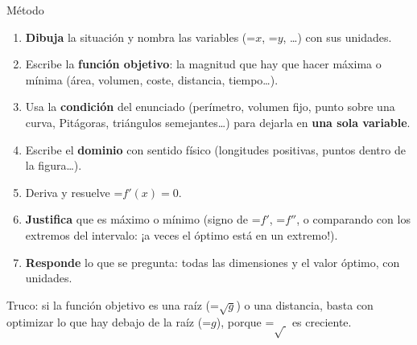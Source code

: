 \documentclass[11pt,a4paper]{article}
\newcommand{\fmm}[1]{\setbox0=\hbox{$#1$}\ifdim\wd0>\linewidth\fmdisp{#1}\else\mbox{\box0}\fi}
\newcommand{\fmdisp}[1]{\[\setbox2=\hbox{$\displaystyle #1$}\ifdim\wd2>\linewidth\resizebox{\linewidth}{!}{\box2}\else\box2\fi\]}
\begin{document}
\begin{fmdef}{Método}
\begin{enumerate}
\item \textbf{Dibuja} la situación y nombra las variables (\fmm{x}, \fmm{y}, \dots{}) con sus unidades.
\item Escribe la \textbf{función objetivo}: la magnitud que hay que hacer máxima o mínima (área, volumen, coste, distancia, tiempo\dots{}).
\item Usa la \textbf{condición} del enunciado (perímetro, volumen fijo, punto sobre una curva, Pitágoras, triángulos semejantes\dots{}) para dejarla en \textbf{una sola variable}.
\item Escribe el \textbf{dominio} con sentido físico (longitudes positivas, puntos dentro de la figura\dots{}).
\item Deriva y resuelve \fmm{f'(x)=0}.
\item \textbf{Justifica} que es máximo o mínimo (signo de \fmm{f'}, \fmm{f''}, o comparando con los extremos del intervalo: ¡a veces el óptimo está en un extremo!).
\item \textbf{Responde} lo que se pregunta: todas las dimensiones y el valor óptimo, con unidades.
\end{enumerate}

\begin{center}\colorbox{fmyellow!45}{\parbox{0.9\linewidth}{\centering\strut Truco: si la función objetivo es una raíz (\fmm{\sqrt{g}}) o una distancia, basta con optimizar lo que hay debajo de la raíz (\fmm{g}), porque \fmm{\sqrt{\ }} es creciente.\strut}}\end{center}
\end{fmdef}
\end{document}
